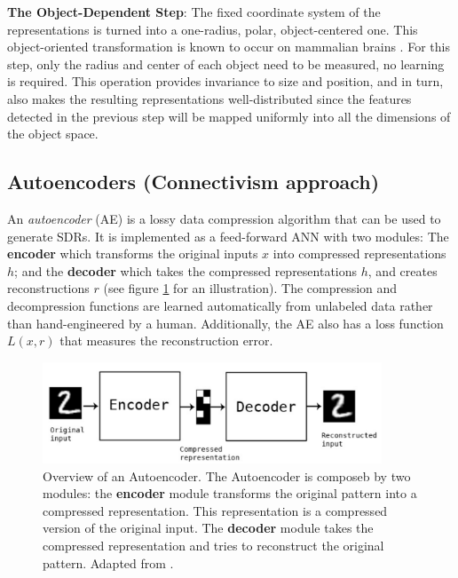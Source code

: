 \documentclass[runningheads]{llncs}
\begin{document}
\textbf{The Object-Dependent Step}: The fixed coordinate system of the representations is turned into a one-radius, polar, object-centered one. This object-oriented transformation is known to occur on mammalian brains \cite{chafee2007representing}. For this step, only the radius and center of each object need to be measured, no learning is required. This operation provides invariance to size and position, and in turn, also makes the resulting representations well-distributed since the features detected in the previous step will be mapped uniformly into all the dimensions of the object space. 

\subsection{Autoencoders (Connectivism approach)}
\label{sec:prescriptions_AEs}


An \textit{autoencoder} (AE) is a lossy data compression algorithm that can be used to generate SDRs. It is implemented as a feed-forward ANN with two modules: The \textbf{encoder} which transforms the original inputs $x$ into compressed representations $h$; and the \textbf{decoder} which takes the compressed representations $h$, and creates reconstructions $r$ (see figure \ref{fig:autoencoder} for an illustration). The compression and decompression functions are learned automatically from unlabeled data rather than hand-engineered by a human. Additionally, the AE also has a loss function $L(x,r)$ that measures the reconstruction error.

\begin{figure}[h]
    \centering
    \includegraphics[width=0.9\textwidth]{img/autoencoder.PNG}
    \caption{Overview of an Autoencoder. The Autoencoder is composeb by two modules: the \textbf{encoder} module transforms the original pattern into a compressed representation. This representation is a compressed version of the original input. The \textbf{decoder} module takes the compressed representation and tries to reconstruct the original pattern. Adapted from \cite{chollet2016building}.}
\label{fig:autoencoder}
\end{figure}
\end{document}
